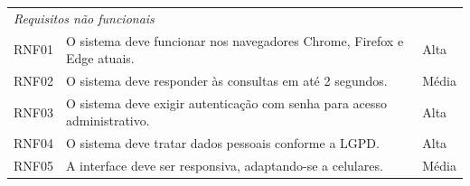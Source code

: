 {\begin{longtable}{@{}l p{9.5cm} l@{}}
	\midrule
	\multicolumn{3}{l}{\textit{Requisitos não funcionais}} \\
	RNF01 & O sistema deve funcionar nos navegadores Chrome, Firefox e Edge atuais. & Alta \\
	RNF02 & O sistema deve responder às consultas em até 2 segundos. & Média \\
	RNF03 & O sistema deve exigir autenticação com senha para acesso administrativo. & Alta \\
	RNF04 & O sistema deve tratar dados pessoais conforme a LGPD. & Alta \\
	RNF05 & A interface deve ser responsiva, adaptando-se a celulares. & Média \\
\end{longtable}
}
